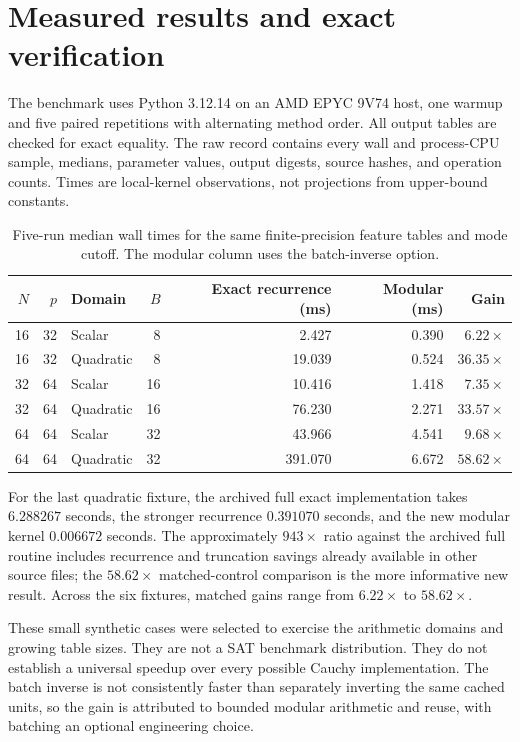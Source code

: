 \documentclass[11pt]{article}
\theoremstyle{definition}\newtheorem{definition}[theorem]{Definition}
\theoremstyle{remark}\newtheorem{remark}[theorem]{Remark}
\begin{document}
\section{Measured results and exact verification}
\label{sec:measurements}

The benchmark uses Python 3.12.14 on an AMD EPYC 9V74 host, one warmup and
five paired repetitions with alternating method order. All output tables
are checked for exact equality. The raw record contains every wall and
process-CPU sample, medians, parameter values, output digests, source hashes,
and operation counts. Times are local-kernel observations, not projections
from upper-bound constants.

\begin{table}[ht]
\centering\small
\begin{tabular}{@{}rrlrrrr@{}}
\toprule
$N$ & $p$ & Domain & $B$ & Exact recurrence (ms) & Modular (ms) & Gain\\\midrule
16&32&Scalar&8&2.427&0.390&$6.22\times$\\
16&32&Quadratic&8&19.039&0.524&$36.35\times$\\
32&64&Scalar&16&10.416&1.418&$7.35\times$\\
32&64&Quadratic&16&76.230&2.271&$33.57\times$\\
64&64&Scalar&32&43.966&4.541&$9.68\times$\\
64&64&Quadratic&32&391.070&6.672&$58.62\times$\\
\bottomrule
\end{tabular}
\caption{Five-run median wall times for the same finite-precision feature
tables and mode cutoff. The modular column uses the batch-inverse option.}
\label{tab:bench}
\end{table}

For the last quadratic fixture, the archived full exact implementation takes
$6.288267$ seconds, the stronger recurrence $0.391070$ seconds, and the new
modular kernel $0.006672$ seconds. The approximately $943\times$ ratio against
the archived full routine includes recurrence and truncation savings already
available in other source files; the $58.62\times$ matched-control comparison
is the more informative new result. Across the six fixtures, matched gains
range from $6.22\times$ to $58.62\times$.

These small synthetic cases were selected to exercise the arithmetic domains
and growing table sizes. They are not a SAT benchmark distribution. They do
not establish a universal speedup over every possible Cauchy implementation.
The batch inverse is not consistently faster than separately inverting the
same cached units, so the gain is attributed to bounded modular arithmetic
and reuse, with batching an optional engineering choice.
\end{document}
